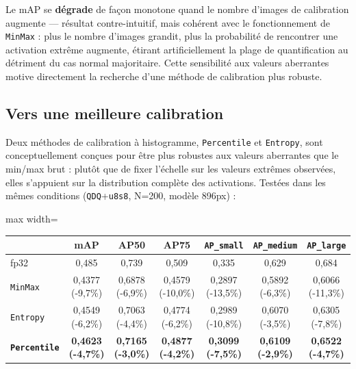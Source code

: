 \documentclass[11pt,a4paper]{article}
\let\Oldsubsection\subsection
\renewcommand{\subsection}{\FloatBarrier\Oldsubsection}
\begin{document}
    Le mAP se \textbf{dégrade} de façon monotone quand le nombre d'images
    de calibration augmente --- résultat contre-intuitif, mais cohérent
    avec le fonctionnement de \texttt{MinMax} : plus le nombre d'images
    grandit, plus la probabilité de rencontrer une activation extrême
    augmente, étirant artificiellement la plage de quantification au
    détriment du cas normal majoritaire. Cette
    sensibilité aux valeurs aberrantes motive directement la recherche
    d'une méthode de calibration plus robuste.
    
    \subsection{Vers une meilleure calibration}
    
    Deux méthodes de calibration à histogramme, \texttt{Percentile} et
    \texttt{Entropy}, sont conceptuellement conçues pour être plus
    robustes aux valeurs aberrantes que le min/max brut : plutôt que de
    fixer l'échelle sur les valeurs extrêmes observées, elles s'appuient
    sur la distribution complète des activations. Testées dans les mêmes
    conditions (\texttt{QDQ}+\texttt{u8s8}, N=200, modèle 896px) :
    
    \begin{table}[!htbp]
    \centering
    \footnotesize
    \begin{adjustbox}{max width=\linewidth}
    \begin{tabular}{@{}lcccccc@{}}
    \toprule
    & \textbf{mAP} & \textbf{AP50} & \textbf{AP75} & \textbf{\texttt{AP\_small}} & \textbf{\texttt{AP\_medium}} & \textbf{\texttt{AP\_large}} \\
    \midrule
    fp32 & 0,485 & 0,739 & 0,509 & 0,335 & 0,629 & 0,684 \\
    \midrule
    \texttt{MinMax} & 0,4377 (-9,7\%) & 0,6878 (-6,9\%) & 0,4579 (-10,0\%) & 0,2897 (-13,5\%) & 0,5892 (-6,3\%) & 0,6066 (-11,3\%) \\
    \texttt{Entropy} & 0,4549 (-6,2\%) & 0,7063 (-4,4\%) & 0,4774 (-6,2\%) & 0,2989 (-10,8\%) & 0,6070 (-3,5\%) & 0,6305 (-7,8\%) \\
    \textbf{\texttt{Percentile}} & \textbf{0,4623 (-4,7\%)} & \textbf{0,7165 (-3,0\%)} & \textbf{0,4877 (-4,2\%)} & \textbf{0,3099 (-7,5\%)} & \textbf{0,6109 (-2,9\%)} & \textbf{0,6522 (-4,7\%)} \\
    \bottomrule
    \end{tabular}
    \end{adjustbox}
    \end{table}
    
\end{document}
